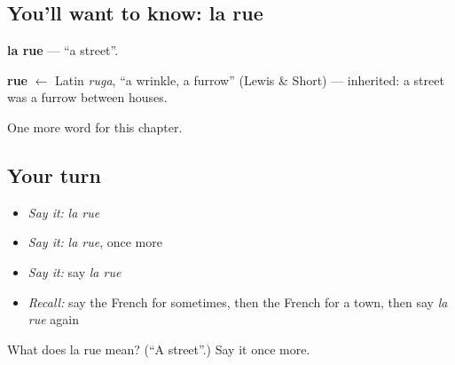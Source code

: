 \subsection*{You'll want to know: la rue}
\textbf{la rue} — \textquotedblleft{}a street\textquotedblright{}.

\begin{cousinweb}
\textbf{rue} $\leftarrow$ Latin \emph{ruga}, \textquotedblleft{}a wrinkle, a furrow\textquotedblright{} (Lewis \& Short) — inherited: a street was a furrow between houses.
\end{cousinweb}

\begin{grammarlens}[title={What you've built}]
One more word for this chapter.
\end{grammarlens}

\subsection*{Your turn}
\begin{itemize}
\raggedright
  \item \emph{Say it:} \emph{la rue}
  \item \emph{Say it:} \emph{la rue}, once more
  \item \emph{Say it:} say \emph{la rue}
  \item \emph{Recall:} say the French for sometimes, then the French for a town, then say \emph{la rue} again
\end{itemize}

\begin{tcolorbox}[breakable,colback=teal!4,colframe=teal!35!black,title={Before you move on}]
What does la rue mean? (\textquotedblleft{}A street\textquotedblright{}.) Say it once more.
\end{tcolorbox}
